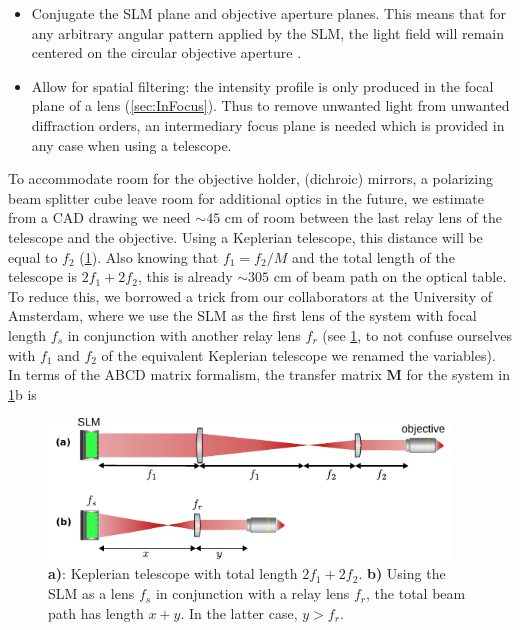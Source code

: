 \begin{itemize}
    \item Conjugate the SLM plane and objective aperture planes.
    This means that for any arbitrary angular pattern applied by the SLM, the light field will remain centered on the circular objective aperture \cite{Nogrette2014}. 
    
    \item Allow for spatial filtering: the intensity profile is only produced in the focal plane of a lens (\cref{sec:InFocus}).
    Thus to remove unwanted light from unwanted diffraction orders, an intermediary focus plane is needed which is provided in any case when using a telescope.
\end{itemize}
To accommodate room for the objective holder, (dichroic) mirrors, a polarizing beam splitter cube leave room for additional optics in the future, we estimate from a CAD drawing we need $\sim 45$ cm of room between the last relay lens of the telescope and the objective. 
Using a Keplerian telescope, this distance will be equal to $f_2$ (\cref{fig:SLMbeampath}).
Also knowing that $f_1=f_2/M$ and the total length of the telescope is $2f_1+2f_2$, this is already $\sim 305$ cm of beam path on the optical table. 
To reduce this, we borrowed a trick from our collaborators at the University of Amsterdam, where we use the SLM as the first lens of the system with focal length $f_s$ in conjunction with another relay lens $f_r$ (see \cref{fig:SLMbeampath}, to not confuse ourselves with $f_1$ and $f_2$ of the equivalent Keplerian telescope we renamed the variables). 
In terms of the ABCD matrix formalism, the transfer matrix $\mathbf{M}$ for the system in \cref{fig:SLMbeampath}b is

\begin{figure}
	\centering
	\includegraphics[width=0.95\textwidth]{figures/beampathSLM.pdf}
	\caption{\textsf{\textbf{a)}}: Keplerian telescope with total length $2f_1+2f_2$. \textsf{\textbf{b)}} Using the SLM as a lens $f_s$ in conjunction with a relay lens $f_r$, the total beam path has length $x+y$. In the latter case, $y>f_r$.}
	\label{fig:SLMbeampath}
\end{figure}

